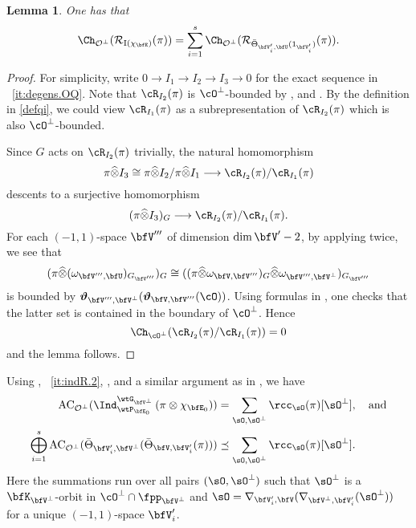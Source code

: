 \documentclass[12pt,a4paper]{amsart}
\newcommand{\AC}{\mathrm{AC}}
\newcommand{\CO}{{\mathcal {O}}}
\newcommand{\CR}{{\mathcal {R}}}
\newcommand{\RI}{{\mathrm {I}}}
\def\DD{\nabla}
\numberwithin{equation}{section}
\newtheorem{lem}[thm]{Lemma}
\theoremstyle{remark}
\def\abfV{\bfV'}
\def\Thetab{\bar{\Theta}}
\def\bfVpe{\bfV^\perp}
\def\totimes{\widehat{\otimes}}
\begin{document}
\begin{lem}\label{decomindq}
One has that
\[
  \Ch_{\CO^\perp}( \CR_{\RI(\chi_{\bfE})} (\pi))=\sum_{i=1}^s \Ch_{\CO^\perp}( \CR_{\Thetab_{\abfV_i,\bfU}(1_{\abfV_i})} (\pi)).
 \]
\end{lem}
\begin{proof}
For simplicity, write $0\rightarrow I_1\rightarrow I_2\rightarrow I_3\rightarrow
0$ for the exact sequence in ~\ref{it:degens.OQ}.
Note that $\cR_{I_2}(\pi)$ is $\cO^\perp$-bounded by ,
 and \cite[Theorem~1.4]{SV}.
By the definition in \cref{defqi}, we could view $\cR_{I_1}(\pi)$ as a
subrepresentation of  $ \cR_{I_2}(\pi)$ which is also $\cO^\perp$-bounded.

Since $G$ acts on $\cR_{I_2}(\pi)$ trivially, the natural homomorphism
\[
  \pi\totimes I_3\cong \pi\totimes I_2/\pi \totimes I_1\longrightarrow \cR_{I_2}(\pi)/\cR_{I_1}(\pi)\]
descents to a surjective homomorphism
\[
  (\pi\totimes  I_3)_{G}\longrightarrow \cR_{I_2}(\pi)/\cR_{I_1}(\pi).
\]
For each $(-1,1)$-space $\bfV'''$ of dimension $\dim
\abfV-2$, by applying  twice,
we see that
\[
(\pi\totimes (\omega_{\bfV''',\bfU})_{ G_{\bfV'''}})_{G}\cong ((\pi\totimes \omega_{\bfV,\bfV'''})_G\totimes \omega_{\bfV''',\bfVpe})_{ G_{\bfV'''}}
\]
 is
bounded by
$\oliftc_{\bfV''', \bfVpe}(\oliftc_{\bfV,\bfV'''}(\cO))$. Using formulas in  \cite[Theorem~5.2 and 5.6]{DKPC}, one checks that the latter set is contained in the boundary of  $\cO^\perp
$. Hence
\[
\Ch_{\cO^\perp}(\cR_{I_2}(\pi)/\cR_{I_1}(\pi)) = 0
\] and the lemma follows.
\end{proof}

Using , ~\ref{it:indR.2}, \cite[Theorem~1.4]{SV},  and a
similar argument as in , we have
  \begin{align}
    \label{chopq1}
      \AC_{\CO^\perp}(\Ind_{\wtP_{\bfE_0}}^{\wtG_{\bfV^\perp}} \left(\pi\otimes
        \chi_{\bfE_0}\right)) &= \sum_{\sO, \sO^\perp} \rcc_\sO(\pi) [\sO^\perp ],
      \quad \text{and}\\
    \label{chopq2}
      \bigoplus_{i=1}^s \AC_{
        \CO^\perp}(\Thetab_{\abfV_i, \bfV^\perp}(\Thetab_{\bfV,\abfV_i}(\pi)))& \preceq
      \sum_{\sO, \sO^\perp} \rcc_\sO(\pi) [\sO^\perp ].
  \end{align}
  Here
  the summations run over all pairs $(\sO,\sO^\perp)$ such that $\sO^\perp$ is a
  $\bfK_{\bfVpe}$-orbit in  $\cO^\perp\cap \fpp_{\bfVpe}$ and $\sO =
  \DD_{\abfV_i,\bfV}(\DD_{\bfVpe,\abfV_i}(\sO^\perp))$ for a unique $(-1,1)$-space $\abfV_i$.
\end{document}
